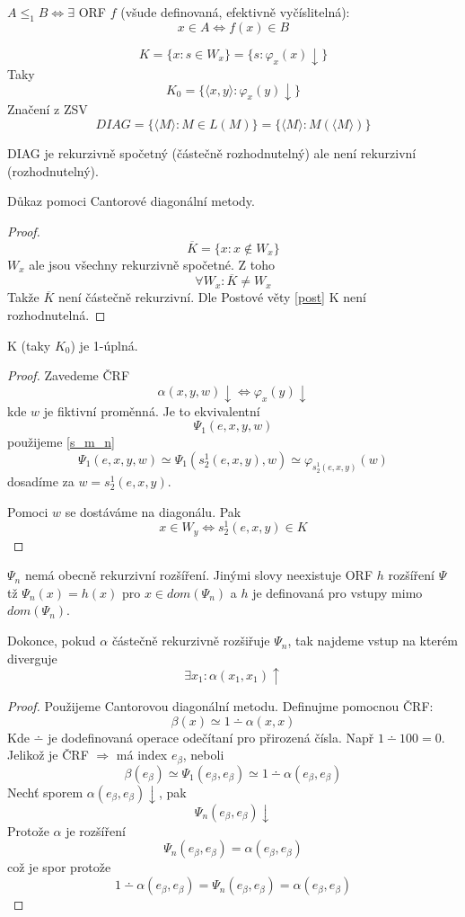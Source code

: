 \begin{definition}
	$A \leq_1 B \iff \exists$ ORF $f$ (všude definovaná, efektivně vyčíslitelná):
	\[ x \in A \iff f(x) \in B \]
\end{definition}

\begin{notation}
	\[ K = \{ x: s \in W_x \} = \{ s: \varphi_x(x) \downarrow \} \]
	Taky
	\[ K_0 = \{ \langle x, y \rangle: \varphi_x(y) \downarrow \} \]
	Značení z ZSV
	\[ DIAG = \{ \langle M \rangle: M \in L(M) \} = \{ \langle M \rangle: M(\langle M \rangle) \} \]
\end{notation}

\begin{note}
	DIAG je rekurzivně spočetný (částečně rozhodnutelný) ale není rekurzivní (rozhodnutelný).

	Důkaz pomoci Cantorové diagonální metody.
\end{note}
\begin{proof}
	\[ \overline{K} = \{ x: x \notin W_x \} \]
	$W_x$ ale jsou všechny rekurzivně spočetné.
	Z toho
	\[ \forall W_x: \overline{K} \neq W_x \]
	Takže $\overline{K}$ není částečně rekurzivní.
	Dle Postové věty \cref{post} K není rozhodnutelná.
\end{proof}

\begin{theorem}[K 1-complete]
	K (taky $K_0$) je 1-úplná.
\end{theorem}
\begin{proof}
	Zavedeme ČRF
	\[ \alpha(x, y, w) \downarrow \iff \varphi_x(y) \downarrow\]
	kde $w$ je fiktivní proměnná.
	Je to ekvivalentní
	\[ \Psi_1(e, x, y, w) \]
	použijeme \cref{s_m_n}
	\[ \Psi_1(e, x, y, w) \simeq \Psi_1(s_2^1(e, x, y), w) \simeq \varphi_{s_2^1(e, x, y)}(w) \]
	dosadíme za $w = s_2^1(e, x, y)$.

	Pomoci $w$ se dostáváme na diagonálu. Pak
	\[ x \in W_y \iff s_2^1(e, x, y) \in K \]
\end{proof}

\begin{theorem}
	$\Psi_n$ nemá obecně rekurzivní rozšíření.
	Jinými slovy neexistuje ORF $h$ rozšíření $\Psi$ tž
	$\Psi_n(x) = h(x)$ pro $x \in dom(\Psi_n)$ a $h$ je definovaná pro vstupy mimo $dom(\Psi_n)$.

	Dokonce, pokud $\alpha$ částečně rekurzivně rozšiřuje $\Psi_n$, tak najdeme vstup na kterém diverguje
	\[ \exists x_1: \alpha(x_1, x_1) \uparrow \]
\end{theorem}
\begin{proof}
	Použijeme Cantorovou diagonální metodu.
	Definujme pomocnou ČRF:
	\[ \beta(x) \simeq 1 \dotminus \alpha(x, x) \]
	Kde $\dotminus$ je dodefinovaná operace odečítaní pro přirozená čísla.
	Např $1 \dotminus 100 = 0$.
	Jelikož je ČRF $\Rightarrow$ má index $e_{\beta}$, neboli
	\[ \beta(e_{\beta}) \simeq \Psi_1(e_{\beta}, e_{\beta}) \simeq 1 \dotminus \alpha(e_{\beta}, e_{\beta}) \]
	Nechť sporem $\alpha(e_{\beta}, e_{\beta}) \downarrow$, pak
	\[ \Psi_n(e_{\beta}, e_{\beta}) \downarrow \]
	Protože $\alpha$ je rozšíření
	\[ \Psi_n(e_{\beta}, e_{\beta}) = \alpha(e_{\beta}, e_{\beta})\]
	což je spor protože
	\[ 1 \dotminus \alpha(e_{\beta}, e_{\beta}) = \Psi_n(e_{\beta}, e_{\beta}) = \alpha(e_{\beta}, e_{\beta})\]
\end{proof}
